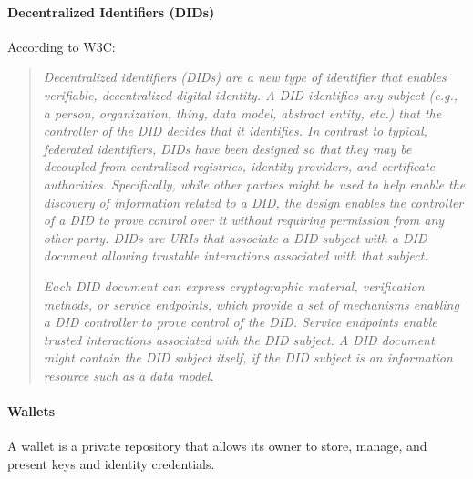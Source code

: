 \documentclass[a4paper, 12pt]{article} %
\begin{document}
                \paragraph{Decentralized Identifiers (DIDs)}
                    According to W3C\cite{w3c-did}:
                    \begin{quote}
                        \textit{Decentralized identifiers (DIDs) are a new type of identifier that enables verifiable, decentralized digital identity. A DID identifies any subject (e.g., a person, organization, thing, data model, abstract entity, etc.) that the controller of the DID decides that it identifies. In contrast to typical, federated identifiers, DIDs have been designed so that they may be decoupled from centralized registries, identity providers, and certificate authorities. Specifically, while other parties might be used to help enable the discovery of information related to a DID, the design enables the controller of a DID to prove control over it without requiring permission from any other party. DIDs are URIs that associate a DID subject with a DID document allowing trustable interactions associated with that subject.}
                        
                        \textit{Each DID document can express cryptographic material, verification methods, or service endpoints, which provide a set of mechanisms enabling a DID controller to prove control of the DID. Service endpoints enable trusted interactions associated with the DID subject. A DID document might contain the DID subject itself, if the DID subject is an information resource such as a data model.}
                    \end{quote}
                \paragraph{Wallets}
                    A wallet\cite{ssi-wallets} is a private repository that allows its owner to store, manage, and present keys and identity credentials.\\
                    
\end{document}
